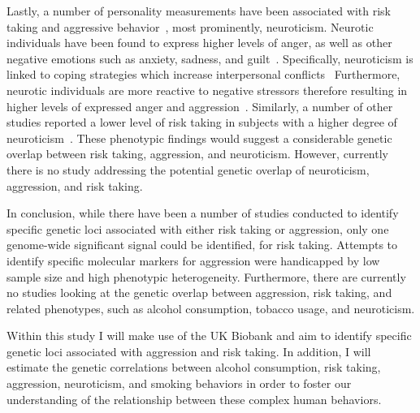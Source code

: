 Lastly, a number of personality measurements have been associated with risk taking and aggressive behavior~\cite{Anderson2002a},
most prominently, neuroticism.
Neurotic individuals have been found to express higher levels of anger, as well as other negative emotions such as anxiety, sadness, and guilt~\cite{Watson1984}.
Specifically, neuroticism is linked to coping strategies which increase interpersonal conflicts~\cite{Bolger1991,Ode2008}
Furthermore, neurotic individuals are more reactive to negative stressors therefore resulting in higher levels of expressed anger and aggression~\cite{Ode2008}.
Similarly, a number of other studies reported a lower level of risk taking in subjects with a higher degree of neuroticism~\cite{Lauriola2001,InstituteofMedicine2011,Paulus2003}.
These phenotypic findings would suggest a considerable genetic overlap between risk taking, aggression, and neuroticism.
However, currently there is no study addressing the potential genetic overlap of neuroticism, aggression, and risk taking.

In conclusion, while there have been a number of studies conducted to identify specific genetic loci associated  with either risk taking or aggression, only one genome-wide significant signal could be identified, for risk taking.
Attempts to identify specific molecular markers for aggression were handicapped by low sample size and high phenotypic heterogeneity.
Furthermore, there are currently no studies looking at the genetic overlap between aggression, risk taking, and related phenotypes, such as alcohol consumption, tobacco usage, and neuroticism.

Within this study I will make use of the UK Biobank and aim to identify specific genetic loci associated with aggression and risk taking.
In addition, I will estimate the genetic correlations between alcohol consumption, risk taking, aggression, neuroticism, and smoking behaviors in order to foster our understanding of the relationship between these complex human behaviors.

